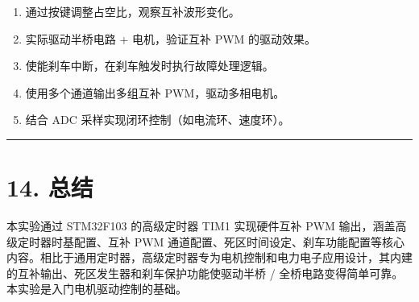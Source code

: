 \documentclass[
  chinese,
  UTF8,
  oneside,
  openany]{ctexbook}
\providecommand{\tightlist}{%
  \setlength{\itemsep}{0pt}\setlength{\parskip}{0pt}}
\begin{document}
\begin{enumerate}
\def\labelenumi{\arabic{enumi}.}
\tightlist
\item
  通过按键调整占空比，观察互补波形变化。
\item
  实际驱动半桥电路 + 电机，验证互补 PWM 的驱动效果。
\item
  使能刹车中断，在刹车触发时执行故障处理逻辑。
\item
  使用多个通道输出多组互补 PWM，驱动多相电机。
\item
  结合 ADC 采样实现闭环控制（如电流环、速度环）。
\end{enumerate}

\begin{center}\rule{0.5\linewidth}{0.5pt}\end{center}

\section{14. 总结}\label{ux603bux7ed3-5}

本实验通过 STM32F103 的高级定时器 TIM1 实现硬件互补 PWM
输出，涵盖高级定时器时基配置、互补 PWM
通道配置、死区时间设定、刹车功能配置等核心内容。相比于通用定时器，高级定时器专为电机控制和电力电子应用设计，其内建的互补输出、死区发生器和刹车保护功能使驱动半桥
/ 全桥电路变得简单可靠。本实验是入门电机驱动控制的基础。

\backmatter
\end{document}
